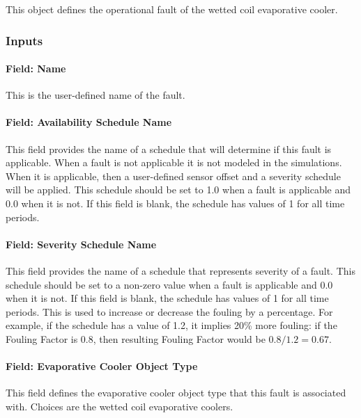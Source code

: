 This object defines the operational fault of the wetted coil evaporative cooler.

\subsubsection{Inputs}

\paragraph{Field: Name}

This is the user-defined name of the fault.

\paragraph{Field: Availability Schedule Name}

This field provides the name of a schedule that will determine if this fault is applicable. When a fault is not applicable it is not modeled in the simulations. When it is applicable, then a user-defined sensor offset and a severity schedule will be applied. This schedule should be set to 1.0 when a fault is applicable and 0.0 when it is not. If this field is blank, the schedule has values of 1 for all time periods.

\paragraph{Field: Severity Schedule Name}

This field provides the name of a schedule that represents severity of a fault. This schedule should be set to a non-zero value when a fault is applicable and 0.0 when it is not. If this field is blank, the schedule has values of 1 for all time periods.
This is used to increase or decrease the fouling by a percentage. For example, if the schedule has a value of 1.2, it implies 20\% more fouling: if the Fouling Factor is 0.8, then resulting Fouling Factor would be $0.8 / 1.2 = 0.67$.

\paragraph{Field: Evaporative Cooler Object Type}\label{field-evaporative-cooler-object-type}

This field defines the evaporative cooler object type that this fault is associated with. Choices are the wetted coil evaporative coolers.

